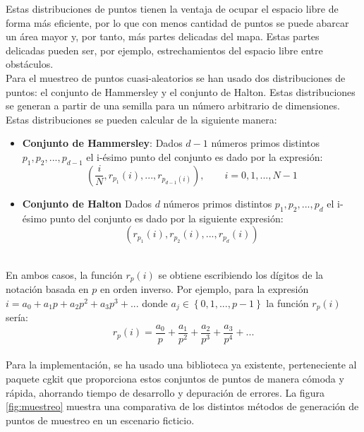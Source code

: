 Estas distribuciones de puntos tienen la ventaja de ocupar el espacio libre de forma más eficiente, por lo que con menos cantidad de puntos se puede abarcar un área mayor y, por tanto, más partes delicadas del mapa. Estas partes delicadas pueden ser, por ejemplo, estrechamientos del espacio libre entre obstáculos.\\


Para el muestreo de puntos cuasi-aleatorios se han usado dos distribuciones de puntos: el conjunto de Hammersley y el conjunto de Halton. Estas distribuciones se generan a partir de una semilla para un número arbitrario de dimensiones. Estas distribuciones se pueden calcular de la siguiente manera:
\begin{itemize}
\item \textbf{Conjunto de Hammersley}: Dados $d-1$ números primos distintos $p_1, p_2, ... , p_{d-1}$ el i-ésimo punto del conjunto es dado por la expresión:
\[ \left( \frac{i}{N}, r_{p_1}(i), ..., r_{p_{d-1}(i)} \right), \qquad i = 0, 1, ..., N-1\]

\item \textbf{Conjunto de Halton} Dados $d$ números primos distintos $p_1, p_2, ..., p_d$ el i-ésimo punto del conjunto es dado por la siguiente expresión:
\[ \left( r_{p_1}(i),  r_{p_2}(i), ...,  r_{p_d}(i) \right) \]

\end{itemize}~\\

En ambos casos, la función $r_p(i)$ se obtiene  escribiendo los dígitos de la notación basada en $p$ en orden inverso. Por ejemplo, para la expresión $i = a_0 + a_1 p + a_2 p^2 + a_3 p^3 + ... $ donde $a_j \in \left\lbrace 0, 1, ... , p-1 \right\rbrace$ la función $r_p(i)$ sería:\\

\[ r_p(i) = \frac{a_0}{p} + \frac{a_1}{p^2} + \frac{a_2}{p^3} + \frac{a_3}{p^4} + ...\]\\

Para la implementación, se ha usado una biblioteca ya existente, perteneciente al paquete cgkit que proporciona estos conjuntos de puntos de manera cómoda y rápida, ahorrando tiempo de desarrollo y depuración de errores. La figura \ref{fig:muestreo} muestra una comparativa de los distintos métodos de generación de puntos de muestreo en un escenario ficticio.\\

